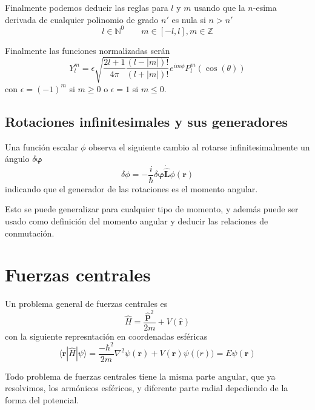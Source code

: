 \documentclass{book}
\numberwithin{equation}{section} %
\begin{document}
Finalmente podemos deducir las reglas para $l$ y $m$ usando que la $n$-esima derivada  de cualquier polinomio de grado $n'$ es nula si $n > n'$
\begin{equation}
    l \in \mathbb{N}^0 \qquad m \in [-l, l], m \in \mathbb{Z}
\end{equation}

Finalmente las funciones normalizadas serán
\begin{equation}
    Y^{m}_l = \epsilon \sqrt{\frac{2l + 1}{4\pi} \frac{(l - |m|)!}{(l + |m|)!}} e^{i m \phi} P^{m}_l(\cos(\theta))
\end{equation}
con $\epsilon = (-1)^m$ si $m \geq 0$ o $\epsilon = 1$ si $m \leq 0$.


\subsection{Rotaciones infinitesimales y sus generadores}

Una función escalar $\phi$ observa el siguiente cambio al rotarse infinitesimalmente un ángulo $\delta \boldsymbol{\varphi}$
\begin{equation}
    \delta \phi = -\frac{i}{\hbar} \delta \boldsymbol{\varphi} \dot \hat{\textbf{L}} \phi(\textbf{r})
\end{equation}
indicando que el generador de las rotaciones es el momento angular.

Esto se puede generalizar para cualquier tipo de momento, y además puede ser usado como definición del momento angular y deducir las relaciones de conmutación.

\section{Fuerzas centrales}

Un problema general de fuerzas centrales es
\begin{equation}
    \hat{H} = \frac{\hat{\boldsymbol{p}}^2}{2m} + V(\hat{\boldsymbol{r}})
\end{equation}
con la siguiente represntación en coordenadas esféricas
\begin{equation}
    \langle \boldsymbol{r}|\hat{H}|\psi\rangle = \frac{-\hbar^2}{2m} \nabla^2 \psi(\boldsymbol{r}) + V(\textbf{r}) \psi(\boldsymbol(r)) = E \psi(\textbf{r}) 
\end{equation}

Todo problema de fuerzas centrales tiene la misma parte angular, que ya resolvimos, los armónicos esféricos, y diferente parte radial depediendo de la forma del potencial.
\end{document}
